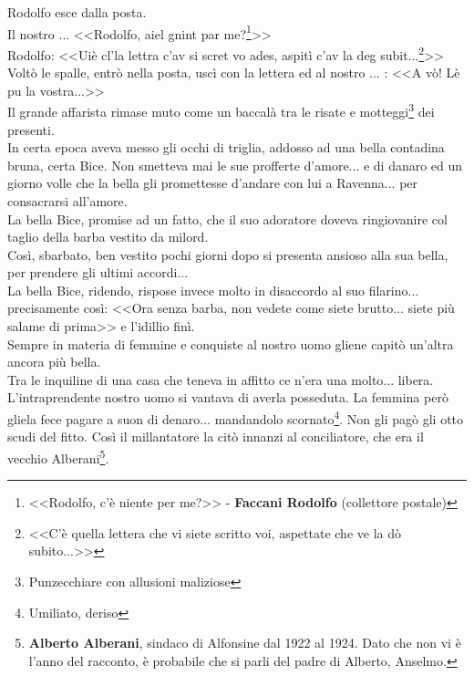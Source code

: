 \indent Rodolfo esce dalla posta.\\
\indent Il nostro .\:.\:.\: <<Rodolfo, aiel gnint par me?\footnote{<<Rodolfo, c'è niente per me?>> - \textbf{Faccani Rodolfo} (collettore postale)}>>\\
\indent Rodolfo: <<Uiè cl'la lettra c'av si scret vo ades, aspitì c'av la deg subit...\footnote{<<C'è quella lettera che vi siete scritto voi, aspettate che ve la dò subito...>>}>>\\
\indent Voltò le spalle, entrò nella posta, uscì con la lettera ed al nostro .\:.\:.\: : <<A vò! Lè pu la vostra...>>\\
\indent Il grande affarista rimase muto come un baccalà tra le risate e motteggi\footnote{Punzecchiare con allusioni maliziose} dei presenti.\\
\indent In certa epoca aveva messo gli occhi di triglia, addosso ad una bella contadina bruna, certa Bice. Non smetteva mai le sue profferte d'amore... e di danaro ed un giorno volle che la bella gli promettesse d'andare con lui a Ravenna... per consacrarsi all'amore.\\
\indent La bella Bice, promise ad un fatto, che il suo adoratore doveva ringiovanire col taglio della barba vestito da milord.\\
\indent Così, sbarbato, ben vestito pochi giorni dopo si presenta ansioso alla sua bella, per prendere gli ultimi accordi...\\
\indent La bella Bice, ridendo, rispose invece molto in disaccordo al suo filarino... precisamente così: <<Ora senza barba, non vedete come siete brutto... siete più salame di prima>> e l'idillio finì.\\
\indent Sempre in materia di femmine e conquiste al nostro uomo gliene capitò un'altra ancora più bella.\\
\indent Tra le inquiline di una casa che teneva in affitto ce n'era una molto... libera. L'intraprendente nostro uomo si vantava di averla posseduta. La femmina però gliela fece pagare a suon di denaro... mandandolo scornato\footnote{Umiliato, deriso}. Non gli pagò gli otto scudi del fitto. Così il millantatore la citò innanzi al conciliatore, che era il vecchio Alberani\footnote{\textbf{Alberto Alberani}, sindaco di Alfonsine dal 1922 al 1924. Dato che non vi è l'anno del racconto, è probabile che si parli del padre di Alberto, Anselmo.}.\\
